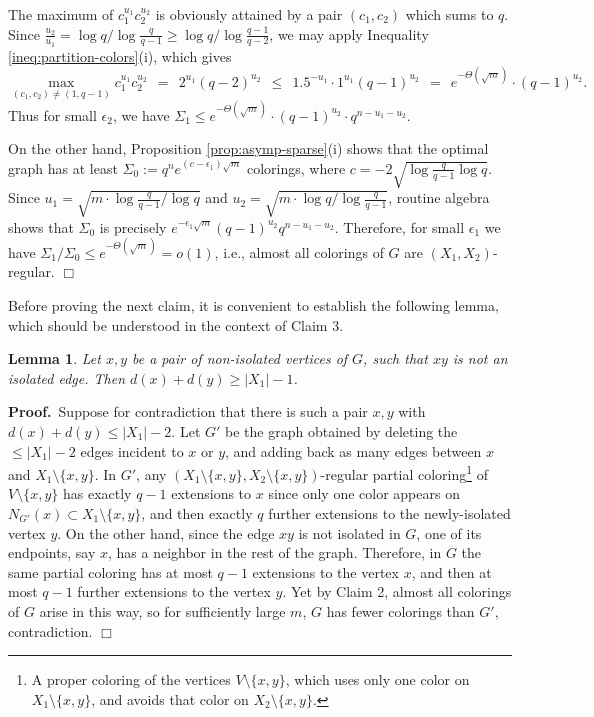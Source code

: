 \documentclass[11pt]{article}
\newtheorem{lemma}[theorem]{Lemma}
\begin{document}
The maximum of $c_1^{u_1} c_2^{u_2}$ is obviously attained by a pair
$(c_1, c_2)$ which sums to $q$.  Since $\frac{u_2}{u_1} = \log q /
\log \frac{q}{q-1} \geq \log q / \log \frac{q-1}{q-2}$, we may apply
Inequality \ref{ineq:partition-colors}(i), which gives
\begin{displaymath}
  \max_{(c_1, c_2) \neq (1, q-1)} c_1^{u_1} c_2^{u_2}
  \ \ = \ \ 
  2^{u_1} (q-2)^{u_2}
  \ \ \leq \ \ 
  1.5^{-u_1} \cdot 1^{u_1} (q-1)^{u_2}
  \ \ = \ \ 
  e^{-\Theta(\sqrt{m})} \cdot (q-1)^{u_2}.
\end{displaymath}
Thus for small $\epsilon_2$, we have $\Sigma_1 \leq
e^{-\Theta(\sqrt{m})} \cdot (q-1)^{u_2} \cdot q^{n - u_1 - u_2}$.

On the other hand, Proposition \ref{prop:asymp-sparse}(i) shows that
the optimal graph has at least $\Sigma_0 := q^n e^{(c-\epsilon_1)
  \sqrt{m}}$ colorings, where $c = -2\sqrt{\log \frac{q}{q-1} \log
  q}$. Since $u_1 = \sqrt{m \cdot \log \frac{q}{q-1} / \log q}$ and
$u_2 = \sqrt{m \cdot \log q / \log \frac{q}{q-1}}$,  routine
algebra shows that $\Sigma_0$ is precisely $e^{-\epsilon_1 \sqrt{m}}
(q-1)^{u_2} q^{n-u_1-u_2}$.  Therefore, for small $\epsilon_1$ we
have $\Sigma_1 / \Sigma_0 \leq e^{-\Theta(\sqrt{m})} = o(1)$, i.e.,
almost all colorings of $G$ are $(X_1, X_2)$-regular.  \hfill $\Box$


\vspace{3mm}


Before proving the next claim, it is convenient to establish the
following lemma, which should be understood in the context of Claim 3.


\begin{lemma}
  \label{lem:exact:sparse:sum-degrees}
  Let $x,y$ be a pair of non-isolated vertices of $G$, such that $xy$
  is not an isolated edge.  Then $d(x) + d(y) \geq |X_1| - 1$.
\end{lemma}

\noindent \textbf{Proof.}\, Suppose for contradiction that there is
such a pair $x,y$ with $d(x) + d(y) \leq |X_1| - 2$.  Let $G'$ be the
graph obtained by deleting the $\leq |X_1|-2$ edges incident to $x$ or
$y$, and adding back as many edges between $x$ and $X_1 \setminus
\{x,y\}$.  In $G'$, any $(X_1 \setminus \{x,y\}, X_2 \setminus
\{x,y\})$-regular partial coloring\footnote{A proper coloring of the
  vertices $V \setminus \{x,y\}$, which uses only one color on $X_1
  \setminus \{x,y\}$, and avoids that color on $X_2 \setminus
  \{x,y\}$.} of $V \setminus \{x,y\}$ has exactly $q-1$ extensions to
$x$ since only one color appears on $N_{G'}(x) \subset X_1 \setminus
\{x,y\}$, and then exactly $q$ further extensions to the
newly-isolated vertex $y$.  
On the other hand, since the edge $xy$ is not isolated in $G$, one of its endpoints, 
say $x$, has a  neighbor in the rest of the graph. Therefore, in $G$ 
the same partial coloring has at most $q-1$ extensions to the vertex $x$, 
and then at most $q-1$ further
extensions to the vertex $y$.  Yet by Claim 2, almost all
colorings of $G$ arise in this way, so for sufficiently large $m$, $G$
has fewer colorings than $G'$, contradiction.  \hfill $\Box$
\end{document}
